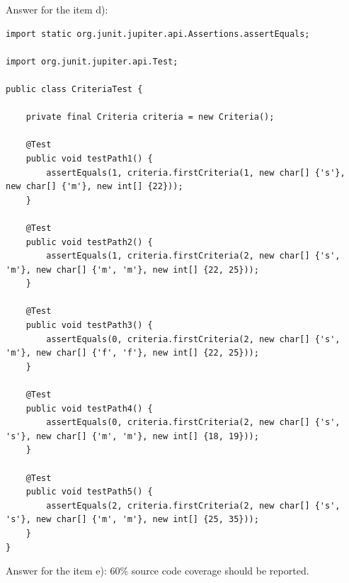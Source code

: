 \begin{exercise}
    Answer for the item d):
    
    \begin{lstlisting}[caption={All of the test cases that are defined by the independent paths of the recruitment program.}]
import static org.junit.jupiter.api.Assertions.assertEquals;

import org.junit.jupiter.api.Test;

public class CriteriaTest {
	
    private final Criteria criteria = new Criteria();
    
    @Test
    public void testPath1() {
        assertEquals(1, criteria.firstCriteria(1, new char[] {'s'}, new char[] {'m'}, new int[] {22}));
    }
    
    @Test
    public void testPath2() {
        assertEquals(1, criteria.firstCriteria(2, new char[] {'s', 'm'}, new char[] {'m', 'm'}, new int[] {22, 25}));
    }
    
    @Test
    public void testPath3() {
        assertEquals(0, criteria.firstCriteria(2, new char[] {'s', 'm'}, new char[] {'f', 'f'}, new int[] {22, 25}));
    }
    
    @Test
    public void testPath4() {
        assertEquals(0, criteria.firstCriteria(2, new char[] {'s', 's'}, new char[] {'m', 'm'}, new int[] {18, 19}));
    }
    
    @Test
    public void testPath5() {
        assertEquals(2, criteria.firstCriteria(2, new char[] {'s', 's'}, new char[] {'m', 'm'}, new int[] {25, 35}));
    }
}
    \end{lstlisting}
    
    Answer for the item e): 60\% source code coverage should be reported.
\end{exercise}

